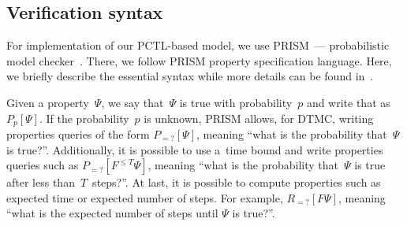 \begin{multicols}{2}
\vspace*{-6pt}

\subsection{Verification syntax}

\noindent
For implementation of our PCTL-based model, we use PRISM~--- 
probabilistic model checker~\cite{kwiatkowska_prism_2011}. There, we follow 
PRISM property specification language. Here, we briefly describe the essential 
syntax while more details can be found in~\cite{noauthor_prism_nodate}.

Given a property~$\Psi$, we say that~$\Psi$ is true with probability~$p$ 
and write that as
$P_p [ \Psi ]$. If the probability~$p$ is unknown, PRISM allows, for DTMC, 
writing properties queries of the form $P_{=?}[ \Psi ]$, meaning 
``what is the probability that~$\Psi$ is true?''. Additionally, it is possible 
to use a~time bound and write properties queries such as 
$P_{=?}[F^{\leq T} \Psi]$, meaning ``what is the probability that~$\Psi$ 
is true after less than~$T$~steps?''. At last, it is possible to compute 
properties such as expected time or expected number of steps. 
For example, $R_{=?}[F \Psi]$, meaning ``what is the expected number of 
steps until $\Psi$ is true?''. 


\setcounter{figure}{3}
\begin{figure*}[b] %
\vspace*{-6pt}
 \begin{center}
 \mbox{%
 \epsfxsize=149.177mm 
 }
 \end{center}
\vspace*{-9pt}

 \label{fig:routes_dtmc_example}
\end{figure*}




\end{multicols}
